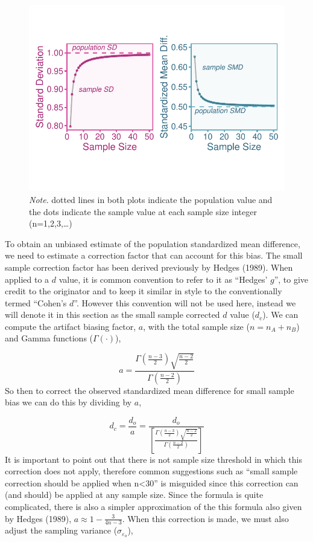 \documentclass[
  letterpaper,
  DIV=11,
  numbers=noendperiod]{scrreprt}
\begin{document}
\begin{figure}

{\centering \includegraphics{small_samples_files/figure-pdf/unnamed-chunk-1-1.pdf}

}

\caption{\emph{Note}. dotted lines in both plots indicate the population
value and the dots indicate the sample value at each sample size integer
(n=1,2,3,\ldots)}

\end{figure}

To obtain an unbiased estimate of the population standardized mean
difference, we need to estimate a correction factor that can account for
this bias. The small sample correction factor has been derived
previously by Hedges (1989). When applied to a \(d\) value, it is common
convention to refer to it as ``Hedges' \(g\)'', to give credit to the
originator and to keep it similar in style to the conventionally termed
``Cohen's \(d\)''. However this convention will not be used here,
instead we will denote it in this section as the small sample corrected
\(d\) value (\(d_c\)). We can compute the artifact biasing factor,
\(a\), with the total sample size (\(n=n_A+n_B\)) and Gamma functions
(\(\Gamma(\cdot)\)),

\[
a = \frac{\Gamma\left(\frac{n-3}{2}\right)\sqrt{\frac{n-2}{2}}}{\Gamma\left(\frac{n-2}{2}\right)}
\] So then to correct the observed standardized mean difference for
small sample bias we can do this by dividing by \(a\),

\[
d_c = \frac{d_o}{a} = \frac{d_o}{ \left[\frac{\Gamma\left(\frac{n-3}{2}\right)\sqrt{\frac{n-2}{2}}}{\Gamma\left(\frac{n-2}{2}\right)}\right]}
\] It is important to point out that there is not sample size threshold
in which this correction does not apply, therefore common suggestions
such as ``small sample correction should be applied when n\textless30''
is misguided since this correction can (and should) be applied at any
sample size. Since the formula is quite complicated, there is also a
simpler approximation of the this formula also given by Hedges (1989),
\(a\approx 1-\frac{3}{4n-3}\). When this correction is made, we must
also adjust the sampling variance (\(\sigma_{\varepsilon_o}\)),
\end{document}
